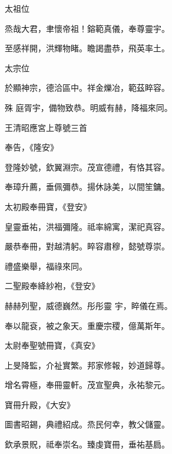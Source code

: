 \begin{pinyinscope}
 太祖位



 烝哉大君，聿懷帝祖！鎔範真儀，奉尊靈宇。



 至感祥開，洪輝物睹。瞻謁盡恭，飛英率土。



 太宗位



 於顯神宗，德洽區中。祥金爍冶，範茲睟容。



 殊
 庭胥宇，備物致恭。明威有赫，降福來同。



 王清昭應宮上尊號三首



 奉告，《隆安》



 登隆妙號，欽翼淵宗。茂宣德禮，有恪其容。



 奉璋升薦，垂佩彌恭。揚休詠美，以間笙鏞。



 太初殿奉冊寶，《登安》



 皇靈垂祐，洪福彌隆。祗率綿寓，潔祀真容。



 嚴恭奉冊，對越清躬。睟容肅穆，懿號尊崇。



 禮盛樂舉，福祿來同。



 二聖殿奉絳紗袍，《登安》



 赫赫列聖，威德巍然。彤彤靈
 宇，睟儀在焉。



 奉以龍袞，被之象天。重慶宗稷，億萬斯年。



 太尉奉聖號冊寶，《真安》



 上旻降監，介祉實繁。邦家修報，妙道歸尊。



 增名霄極，奉冊靈軒。茂宣聖典，永祐黎元。



 寶冊升殿，《大安》



 圖書昭錫，典禮紹成。烝民何幸，教父儲靈。



 欽承景貺，祗奉崇名。臻虔寶冊，垂祐基扃。




\end{pinyinscope}
